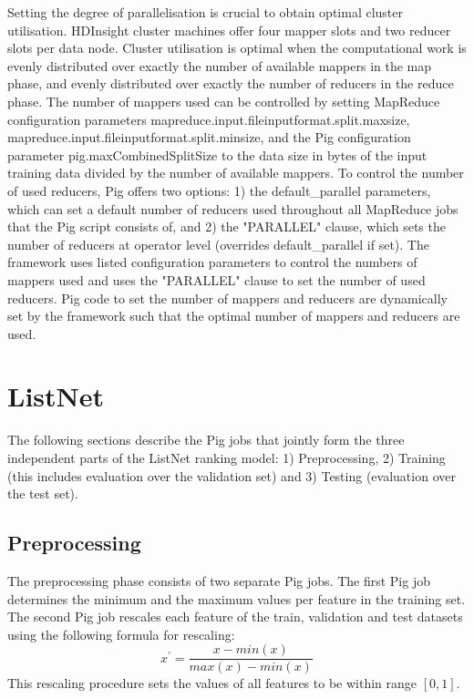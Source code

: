 Setting the degree of parallelisation is crucial to obtain optimal cluster utilisation. HDInsight cluster machines offer four mapper slots and two reducer slots per data node. Cluster utilisation is optimal when the computational work is evenly distributed over exactly the number of available mappers in the map phase, and evenly distributed over exactly the number of reducers in the reduce phase. The number of mappers used can be controlled by setting MapReduce configuration parameters mapreduce.input.fileinputformat.split.maxsize, mapreduce.input.fileinputformat.split.minsize, and the Pig configuration parameter pig.maxCombinedSplitSize to the data size in bytes of the input training data divided by the number of available mappers. To control the number of used reducers, Pig offers two options: 1) the default\_parallel parameters, which can set a default number of reducers used throughout all MapReduce jobs that the Pig script consists of, and 2) the "PARALLEL" clause, which sets the number of reducers at operator level (overrides default\_parallel if set). The framework uses listed configuration parameters to control the numbers of mappers used and uses the "PARALLEL" clause to set the number of used reducers. Pig code to set the number of mappers and reducers are dynamically set by the framework such that the optimal number of mappers and reducers are used.

\section{ListNet}
The following sections describe the Pig jobs that jointly form the three independent parts of the ListNet ranking model: 1) Preprocessing, 2) Training (this includes evaluation over the validation set) and 3) Testing (evaluation over the test set). 
\subsection{Preprocessing}
The preprocessing phase consists of two separate Pig jobs. The first Pig job determines the minimum and the maximum values per feature in the training set. The second Pig job rescales each feature of the train, validation and test datasets using the following formula for rescaling:
\begin{equation}
x^{'} = \frac{x-min(x)}{max(x)-min(x)}
\label{eq:rescaling}
\end{equation}
This rescaling procedure sets the values of all features to be within range $[0,1]$.\\

